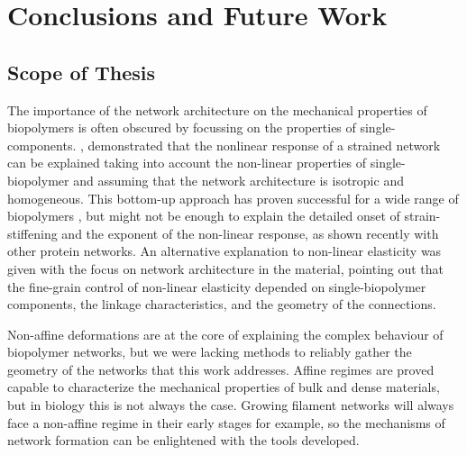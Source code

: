 
\chapter{Conclusions and Future Work}
\label{Chapter-Conclusions}

\section{Scope of Thesis}%
\label{sec:scope_of_thesis}

The importance of the network architecture on the mechanical properties of biopolymers is often obscured by focussing on the properties of single-components. \cite{storm_nonlinear_2005}, demonstrated that the nonlinear response of a strained network can be explained taking into account the non-linear properties of single-biopolymer and assuming that the network architecture is isotropic and homogeneous. This bottom-up approach has proven successful for a wide range of biopolymers \cite{carrillo_nonlinear_2013}, but might not be enough to explain the detailed onset of strain-stiffening and the exponent of the non-linear response, as shown recently with other protein networks\cite{licup_stress_2015}. An alternative explanation to non-linear elasticity was given with the focus on network architecture in the material\cite{onck_alternative_2005}, pointing out that the fine-grain control of non-linear elasticity depended on single-biopolymer components, the linkage characteristics, and the geometry of the connections.


Non-affine deformations are at the core of explaining the complex behaviour of biopolymer networks, but we were lacking methods to reliably gather the geometry of the networks that this work addresses. Affine regimes are proved capable to characterize the mechanical properties of bulk and dense materials, but in biology this is not always the case. Growing filament networks will always face a non-affine regime in their early stages for example, so the mechanisms of network formation can be enlightened with the tools developed.

